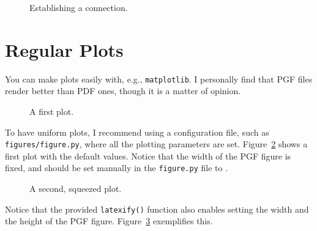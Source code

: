 \begin{figure}
	
	\caption{Establishing a \tcp connection.}
	\label{fig:tips:tcp_open_seqdiag}
\end{figure}

\section{Regular Plots}

You can make plots easily with, e.g., \texttt{matplotlib}.
I personally find that PGF files render better than PDF ones, though it is a matter of opinion.

\begin{figure}
	
	\caption{A first plot.}
	\label{fig:tips:plot_1}
\end{figure}

To have uniform plots, I recommend using a configuration file, such as \texttt{figures/figure.py}, where all the plotting parameters are set.
Figure~\ref{fig:tips:plot_1} shows a first plot with the default values.
Notice that the width of the PGF figure is fixed, and should be set manually in the \texttt{figure.py} file to \the \textwidth.

\begin{figure}
	
	\caption{A second, squeezed plot.}
	\label{fig:tips:plot_2}
\end{figure}

Notice that the provided \texttt{latexify()} function also enables setting the width and the height of the PGF figure.
Figure~\ref{fig:tips:plot_2} exemplifies this.